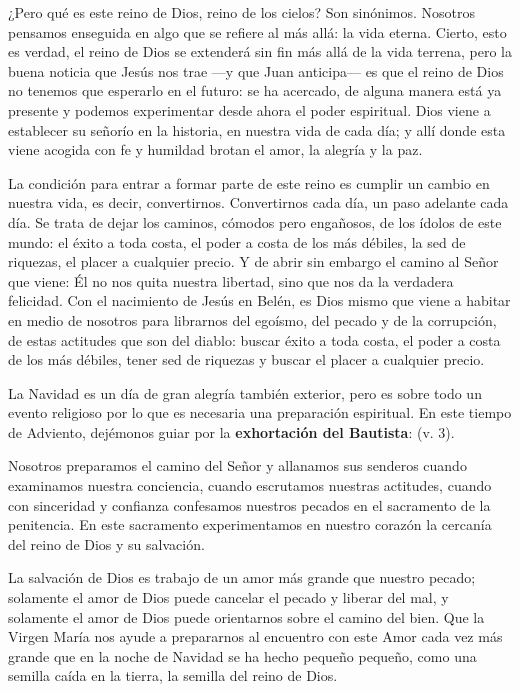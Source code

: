 ¿Pero qué es este reino de Dios, reino de los cielos? Son sinónimos. Nosotros pensamos enseguida en algo que se refiere al más allá: la vida eterna. Cierto, esto es verdad, el reino de Dios se extenderá sin fin más allá de la vida terrena, pero la buena noticia que Jesús nos trae ---y que Juan anticipa--- es que el reino de Dios no tenemos que esperarlo en el futuro: se ha acercado, de alguna manera está ya presente y podemos experimentar desde ahora el poder espiritual. Dios viene a establecer su señorío en la historia, en nuestra vida de cada día; y allí donde esta viene acogida con fe y humildad brotan el amor, la alegría y la paz.

La condición para entrar a formar parte de este reino es cumplir un cambio en nuestra vida, es decir, convertirnos. Convertirnos cada día, un paso adelante cada día. Se trata de dejar los caminos, cómodos pero engañosos, de los ídolos de este mundo: el éxito a toda costa, el poder a costa de los más débiles, la sed de riquezas, el placer a cualquier precio. Y de abrir sin embargo el camino al Señor que viene: Él no nos quita nuestra libertad, sino que nos da la verdadera felicidad. Con el nacimiento de Jesús en Belén, es Dios mismo que viene a habitar en medio de nosotros para librarnos del egoísmo, del pecado y de la corrupción, de estas actitudes que son del diablo: buscar éxito a toda costa, el poder a costa de los más débiles, tener sed de riquezas y buscar el placer a cualquier precio.

La Navidad es un día de gran alegría también exterior, pero es sobre todo un evento religioso por lo que es necesaria una preparación espiritual. En este tiempo de Adviento, dejémonos guiar por la \textbf{exhortación del Bautista}:  (v. 3).

Nosotros preparamos el camino del Señor y allanamos sus senderos cuando examinamos nuestra conciencia, cuando escrutamos nuestras actitudes, cuando con sinceridad y confianza confesamos nuestros pecados en el sacramento de la penitencia. En este sacramento experimentamos en nuestro corazón la cercanía del reino de Dios y su salvación.

La salvación de Dios es trabajo de un amor más grande que nuestro pecado; solamente el amor de Dios puede cancelar el pecado y liberar del mal, y solamente el amor de Dios puede orientarnos sobre el camino del bien. Que la Virgen María nos ayude a prepararnos al encuentro con este Amor cada vez más grande que en la noche de Navidad se ha hecho pequeño pequeño, como una semilla caída en la tierra, la semilla del reino de Dios.



